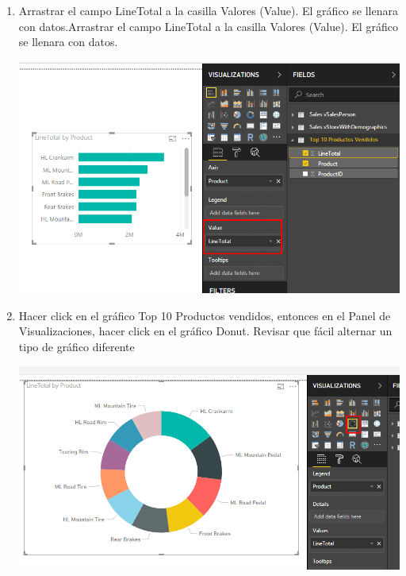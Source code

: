 \begin{itemize}
\begin{enumerate}
\item Arrastrar el campo LineTotal a la casilla Valores (Value). El gráfico se llenara con datos.Arrastrar el campo LineTotal a la casilla Valores (Value). El gráfico se llenara con datos.
\begin{center}
\includegraphics[scale=0.55]{./Imagenes/13.png}
\end{center}

\item Hacer click en el gráfico Top 10 Productos vendidos, entonces en el Panel de Visualizaciones, hacer click en el gráfico Donut. Revisar que fácil alternar un tipo de gráfico diferente
\begin{center}
\includegraphics[scale=0.55]{./Imagenes/14.png}
\end{center}


\end{enumerate}
\end{itemize}
